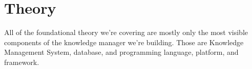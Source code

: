 \chapter{Theory}
\label{chap:theory}

All of the foundational theory we're covering are mostly only the most visible components of the knowledge manager we're building. Those are Knowledge Management System, database, and programming language, platform, and framework.
